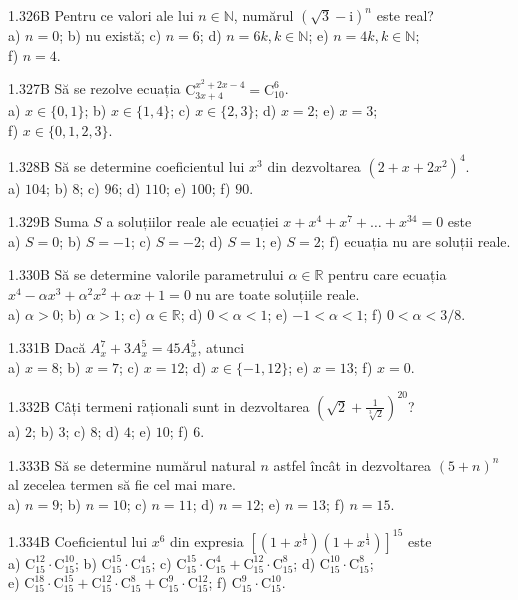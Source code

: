 \documentclass[11pt]{article}
\begin{document}
1.326B Pentru ce valori ale lui $n \in \mathbb{N}$, numărul $(\sqrt{3}-\mathrm{i})^{n}$ este real?\\ a) $n=0$; b) nu există; c) $n=6$; d) $n=6 k, k \in \mathbb{N}$; e) $n=4 k, k \in \mathbb{N}$;\\ f) $n=4$.

1.327B Să se rezolve ecuația $\mathrm{C}_{3 x+4}^{x^{2}+2 x-4}=\mathrm{C}_{10}^{6}$.\\ a) $x \in\{0,1\}$; b) $x \in\{1,4\}$; c) $x \in\{2,3\}$; d) $x=2$; e) $x=3$;\\ f) $x \in\{0,1,2,3\}$.

1.328B Să se determine coeficientul lui $x^{3}$ din dezvoltarea $\left(2+x+2 x^{2}\right)^{4}$.\\ a) $104$; b) $8$; c) $96$; d) $110$; e) $100$; f) $90$.

1.329B Suma $S$ a soluțiilor reale ale ecuației $x+x^{4}+x^{7}+\ldots+x^{34}=0$ este\\ a) $S=0$; b) $S=-1$; c) $S=-2$; d) $S=1$; e) $S=2$; f) ecuația nu are soluții reale.

1.330B Să se determine valorile parametrului $\alpha \in \mathbb{R}$ pentru care ecuația $x^{4}-\alpha x^{3}+\alpha^{2} x^{2}+\alpha x+1=0$ nu are toate soluțiile reale.\\ a) $\alpha>0$; b) $\alpha>1$; c) $\alpha \in \mathbb{R}$; d) $0<\alpha<1$; e) $-1<\alpha<1$; f) $0<\alpha<3 / 8$.

1.331B Dacă $A_{x}^{7}+3 A_{x}^{5}=45 A_{x}^{5}$, atunci\\ a) $x=8$; b) $x=7$; c) $x=12$; d) $x \in\{-1,12\}$; e) $x=13$; f) $x=0$.

1.332B Câți termeni raționali sunt in dezvoltarea $\left(\sqrt{2}+\frac{1}{\sqrt[3]{2}}\right)^{20}$?\\  a) $2$; b) $3$; c) $8$; d) $4$; e) $10$; f) $6$.

1.333B Să se determine numărul natural $n$ astfel încât in dezvoltarea $(5+n)^{n}$ al zecelea termen să fie cel mai mare.\\ a) $n=9$; b) $n=10$; c) $n=11$; d) $n=12$; e) $n=13$; f) $n=15$.

1.334B Coeficientul lui $x^{6}$ din expresia $\left[\left(1+x^{\frac{1}{3}}\right)\left(1+x^{\frac{1}{4}}\right)\right]^{15}$ este\\ a) $\mathrm{C}_{15}^{12} \cdot \mathrm{C}_{15}^{10}$; b) $\mathrm{C}_{15}^{15} \cdot \mathrm{C}_{15}^{4}$; c) $\mathrm{C}_{15}^{15} \cdot \mathrm{C}_{15}^{4}+\mathrm{C}_{15}^{12} \cdot \mathrm{C}_{15}^{8}$; d) $\mathrm{C}_{15}^{10} \cdot \mathrm{C}_{15}^{8}$;\\ e) $\mathrm{C}_{15}^{18} \cdot \mathrm{C}_{15}^{15}+\mathrm{C}_{15}^{12} \cdot \mathrm{C}_{15}^{8}+\mathrm{C}_{15}^{9} \cdot \mathrm{C}_{15}^{12}$; f) $\mathrm{C}_{15}^{9} \cdot \mathrm{C}_{15}^{10}$.
\end{document}
